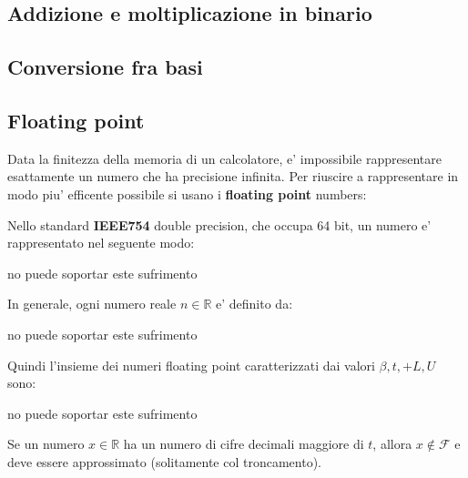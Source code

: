 \subsection{Addizione e moltiplicazione in binario}
\subsection{Conversione fra basi}
\subsection{Floating point}
Data la finitezza della memoria di un calcolatore, e' impossibile rappresentare esattamente un numero che ha precisione infinita. Per riuscire a rappresentare in modo piu' efficente possibile si usano i \textbf{floating point} numbers:

Nello standard \textbf{IEEE754} double precision, che occupa 64 bit, un numero e' rappresentato nel seguente modo:
\begin{center}
    no puede soportar este sufrimento

\end{center}

In generale, ogni numero reale $ n \in \mathbb{R} $ e' definito da:
\begin{center}
    no puede soportar este sufrimento
\end{center}

Quindi l'insieme dei numeri floating point caratterizzati dai valori $ \beta, t, +L, U $ sono:
\begin{center}
    no puede soportar este sufrimento

\end{center}

Se un numero $ x \in \mathbb{R} $ ha un numero di cifre decimali maggiore di $ t $, allora $ x \not\in \mathcal{F} $ e deve essere approssimato (solitamente col troncamento).

